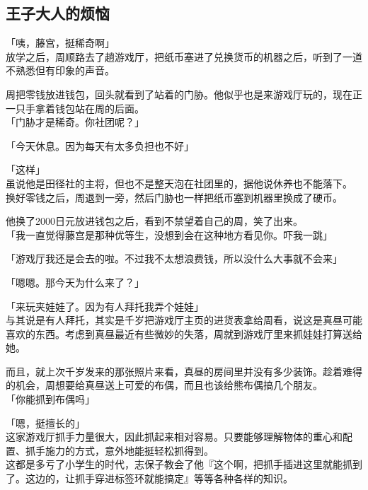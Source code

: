 \subsection{王子大人的烦恼}

「咦，藤宫，挺稀奇啊」\\

放学之后，周顺路去了趟游戏厅，把纸币塞进了兑换货币的机器之后，听到了一道不熟悉但有印象的声音。

周把零钱放进钱包，回头就看到了站着的门胁。他似乎也是来游戏厅玩的，现在正一只手拿着钱包站在周的后面。\\

「门胁才是稀奇。你社团呢？」

「今天休息。因为每天有太多负担也不好」

「这样」\\

虽说他是田径社的主将，但也不是整天泡在社团里的，据他说休养也不能落下。\\

换好零钱之后，周退到一旁，然后门胁也一样把纸币塞到机器里换成了硬币。

他换了2000日元放进钱包之后，看到不禁望着自己的周，笑了出来。\\

「我一直觉得藤宫是那种优等生，没想到会在这种地方看见你。吓我一跳」

「游戏厅我还是会去的啦。不过我不太想浪费钱，所以没什么大事就不会来」

「嗯嗯。那今天为什么来了？」

「来玩夹娃娃了。因为有人拜托我弄个娃娃」\\

与其说是有人拜托，其实是千岁把游戏厅主页的进货表拿给周看，说这是真昼可能喜欢的东西。考虑到真昼最近有些微妙的失落，周就到游戏厅里来抓娃娃打算送给她。

而且，就上次千岁发来的那张照片来看，真昼的房间里并没有多少装饰。趁着难得的机会，周想要给真昼送上可爱的布偶，而且也该给熊布偶搞几个朋友。\\

「你能抓到布偶吗」

「嗯，挺擅长的」\\

这家游戏厅抓手力量很大，因此抓起来相对容易。只要能够理解物体的重心和配置、抓手施力的方式，意外地能挺轻松抓得到。\\

这都是多亏了小学生的时代，志保子教会了他『这个啊，把抓手插进这里就能抓到了。这边的，让抓手穿进标签环就能搞定』等等各种各样的知识。

